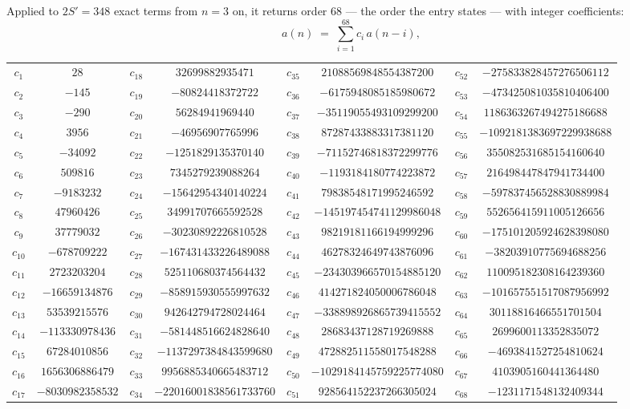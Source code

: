 \documentclass[11pt,a4paper]{article}
\theoremstyle{plain}
\theoremstyle{definition}
\begin{document}
Applied to $2S'=348$ exact terms from $n=3$ on, it returns order $68$ --- the
order the entry states --- with integer coefficients:
\[
a(n)\;=\;\sum_{i=1}^{68}c_i\,a(n-i),
\]
\begin{center}\small
\begin{tabular}{cccccccc}
$c_{1}$ & $28$ & $c_{18}$ & $32699882935471$ & $c_{35}$ & $21088569848554387200$ & $c_{52}$ & $-275833828457276506112$ \\
$c_{2}$ & $-145$ & $c_{19}$ & $-80824418372722$ & $c_{36}$ & $-6175948085185980672$ & $c_{53}$ & $-473425081035810406400$ \\
$c_{3}$ & $-290$ & $c_{20}$ & $56284941969440$ & $c_{37}$ & $-35119055493109299200$ & $c_{54}$ & $1186363267494275186688$ \\
$c_{4}$ & $3956$ & $c_{21}$ & $-46956907765996$ & $c_{38}$ & $87287433883317381120$ & $c_{55}$ & $-1092181383697229938688$ \\
$c_{5}$ & $-34092$ & $c_{22}$ & $-1251829135370140$ & $c_{39}$ & $-71152746818372299776$ & $c_{56}$ & $355082531685154160640$ \\
$c_{6}$ & $509816$ & $c_{23}$ & $7345279239088264$ & $c_{40}$ & $-1193184180774223872$ & $c_{57}$ & $216498447847941734400$ \\
$c_{7}$ & $-9183232$ & $c_{24}$ & $-15642954340140224$ & $c_{41}$ & $79838548171995246592$ & $c_{58}$ & $-597837456528830889984$ \\
$c_{8}$ & $47960426$ & $c_{25}$ & $34991707665592528$ & $c_{42}$ & $-145197454741129986048$ & $c_{59}$ & $552656415911005126656$ \\
$c_{9}$ & $37779032$ & $c_{26}$ & $-30230892226810528$ & $c_{43}$ & $98219181166194999296$ & $c_{60}$ & $-175101205924628398080$ \\
$c_{10}$ & $-678709222$ & $c_{27}$ & $-167431433226489088$ & $c_{44}$ & $46278324649743876096$ & $c_{61}$ & $-38203910775694688256$ \\
$c_{11}$ & $2723203204$ & $c_{28}$ & $525110680374564432$ & $c_{45}$ & $-234303966570154885120$ & $c_{62}$ & $110095182308164239360$ \\
$c_{12}$ & $-16659134876$ & $c_{29}$ & $-858915930555997632$ & $c_{46}$ & $414271824050006786048$ & $c_{63}$ & $-101657551517087956992$ \\
$c_{13}$ & $53539215576$ & $c_{30}$ & $942642794728024464$ & $c_{47}$ & $-338898926865739415552$ & $c_{64}$ & $30118816466551701504$ \\
$c_{14}$ & $-113330978436$ & $c_{31}$ & $-581448516624828640$ & $c_{48}$ & $28683437128719269888$ & $c_{65}$ & $2699600113352835072$ \\
$c_{15}$ & $67284010856$ & $c_{32}$ & $-1137297384843599680$ & $c_{49}$ & $472882511558017548288$ & $c_{66}$ & $-4693841527254810624$ \\
$c_{16}$ & $1656306886479$ & $c_{33}$ & $9956885340665483712$ & $c_{50}$ & $-1029184145759225774080$ & $c_{67}$ & $4103905160441364480$ \\
$c_{17}$ & $-8030982358532$ & $c_{34}$ & $-22016001838561733760$ & $c_{51}$ & $928564152237266305024$ & $c_{68}$ & $-1231171548132409344$ \\
\end{tabular}
\end{center}
\end{document}
